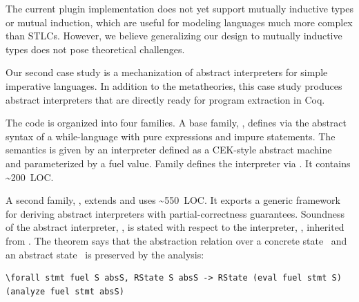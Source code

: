 The current plugin implementation does not yet support
mutually inductive types or mutual induction, which are
useful for modeling languages much more complex than STLCs.
However,
we believe generalizing our design to mutually inductive types does
not pose theoretical challenges.



Our second case study is a mechanization of abstract interpreters
for simple imperative languages.
In addition to the metatheories, this case study produces abstract
interpreters that are directly ready for program extraction in Coq.

The code is organized into four families.
A base family, , defines via  the abstract
syntax of a while-language with pure expressions and impure statements.
The semantics is given by an interpreter defined as a CEK-style abstract
machine~\cite{felleisen1986control} and parameterized by a fuel value.
Family  defines the interpreter via .
It contains \textasciitilde 200~LOC.

A second family, , extends  and uses
\textasciitilde 550~LOC.
It exports a generic framework for deriving
abstract interpreters with partial-correctness guarantees.
Soundness of the abstract interpreter, ,
is stated with respect to the interpreter, , inherited from .
The theorem says that the abstraction relation  over a
concrete state~ and an abstract state~ is preserved
by the analysis:

\begin{centered}
\begin{minipage}{.91\textwidth}
\begin{lstlisting}[basicstyle=\fontsize{8.25}{9}\ttfamily]
\forall stmt fuel S absS, RState S absS -> RState (eval fuel stmt S) (analyze fuel stmt absS)
\end{lstlisting}
\end{minipage}
\end{centered}

